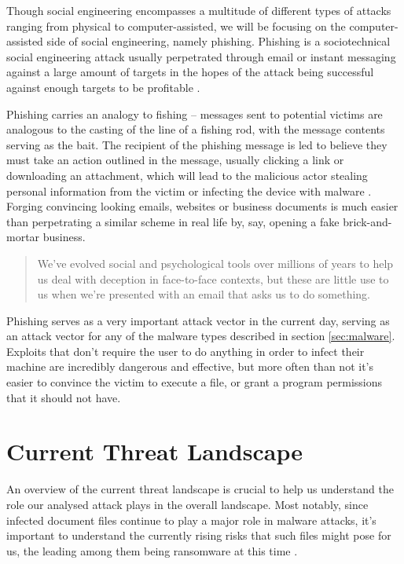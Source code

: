 Though social engineering encompasses a multitude of different types of attacks ranging from physical to
computer-assisted, we will be focusing on the computer-assisted side of social engineering, namely phishing.
Phishing is a sociotechnical social engineering attack usually perpetrated through email or instant messaging 
against a large amount of targets in the hopes of the attack being successful against enough targets to be 
profitable \cite{advanced-social-engineering-attacks}. 

Phishing carries an analogy to fishing -- messages sent to potential victims are analogous to the casting of 
the line of a fishing rod, with the message contents serving as the bait. 
The recipient of the phishing message is led to believe they must take an action outlined in the message,
usually clicking a link or downloading an attachment, which will lead to the malicious actor stealing
personal information from the victim or infecting the device with malware \cite{state-of-phishing}.
Forging convincing looking emails, websites or business documents is much easier than perpetrating a similar 
scheme in real life by, say, opening a fake brick-and-mortar business.
\begin{quote}
  We’ve evolved social and psychological tools over millions of years to help
  us deal with deception in face-to-face contexts, but these are little use to us
  when we’re presented with an email that asks us to do something. \cite{anderson-security-engineering}
\end{quote}

Phishing serves as a very important attack vector in the current day, serving as an attack vector for any of the malware
types described in section \ref{sec:malware}. Exploits that don't require the user to do anything in order to infect
their machine are incredibly dangerous and effective, but more often than not it's easier to convince the victim to
execute a file, or grant a program permissions that it should not have.

\section{Current Threat Landscape}
An overview of the current threat landscape is crucial to help us understand the role our analysed
attack plays in the overall landscape. Most notably, since infected document files continue to play 
a major role in malware attacks, it's important to understand the currently rising risks that such
files might pose for us, the leading among them being ransomware at this time \cite{enisa_threat_landscape}.

